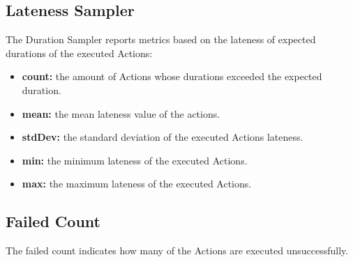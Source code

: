\subsection{Lateness Sampler}
The Duration Sampler reports metrics based on the lateness of expected durations of the executed Actions:
\begin{itemize}
	\item \textbf{count:} the amount of Actions whose durations exceeded the expected duration.
	\item \textbf{mean:} the mean lateness value of the actions.
	\item \textbf{stdDev:} the standard deviation of the executed Actions lateness.
	\item \textbf{min:} the minimum lateness of the executed Actions.
	\item \textbf{max:} the maximum lateness of the executed Actions.
\end{itemize}

\subsection{Failed Count}
The failed count indicates how many of the Actions are executed unsuccessfully.




